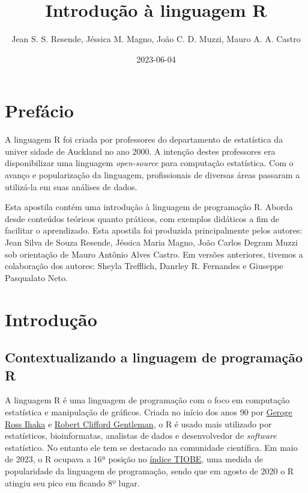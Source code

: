 \documentclass[
]{book}
\title{Introdução à linguagem R}
\author{Jean S. S. Resende, Jéssica M. Magno, João C. D. Muzzi, Mauro A. A. Castro}
\date{2023-06-04}
\begin{document}
\maketitle

{
\setcounter{tocdepth}{1}
\tableofcontents
}
\hypertarget{prefuxe1cio}{%
\chapter{Prefácio}\label{prefuxe1cio}}

A linguagem R foi criada por professores do departamento de estatística da univer sidade de Auckland no ano 2000. A intenção destes professores era disponibilizar uma linguagem \emph{open-source} para computação estatística. Com o avanço e popularização da linguagem, profissionais de diversas áreas passaram a utilizá-la em suas análises de dados.

Esta apostila contém uma introdução à linguagem de programação R. Aborda desde conteúdos teóricos quanto práticos, com exemplos didáticos a fim de facilitar o aprendizado. Esta apostila foi produzida principalmente pelos autores: Jean Silva de Souza Resende, Jéssica Maria Magno, João Carlos Degram Muzzi sob orientação de Mauro Antônio Alves Castro. Em versões anteriores, tivemos a colaboração dos autores: Sheyla Trefflich, Danrley R. Fernandes e Giuseppe Pasqualato Neto.

\hypertarget{introduuxe7uxe3o}{%
\chapter{Introdução}\label{introduuxe7uxe3o}}

\hypertarget{contextualizando-a-linguagem-de-programauxe7uxe3o-r}{%
\section{Contextualizando a linguagem de programação R}\label{contextualizando-a-linguagem-de-programauxe7uxe3o-r}}

A linguagem R é uma linguagem de programação com o foco em computação estatística e manipulação de gráficos. Criada no início dos anos 90 por \href{https://en.wikipedia.org/wiki/Ross_Ihaka}{Geroge Ross Ihaka} e \href{https://en.wikipedia.org/wiki/Robert_Gentleman_(statistician)}{Robert Clifford Gentleman}, o R é usado mais utilizado por estatísticos, bioinformatas, analistas de dados e desenvolvedor de \emph{software} estatístico. No entanto ele tem se destacado na comunidade científica. Em maio de 2023, o R ocupava a 16ª posição no \href{https://www.tiobe.com/tiobe-index/}{índice TIOBE}, uma medida de popularidade da linguagem de programação, sendo que em agosto de 2020 o R atingiu seu pico em ficando 8º lugar.
\end{document}
